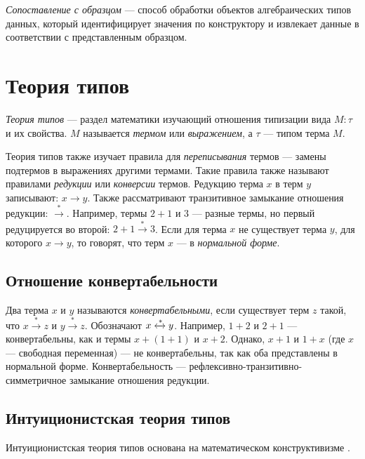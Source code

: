 \emph{Сопоставление с образцом} — способ обработки
объектов %
алгебраических типов данных, который идентифицирует значения по конструктору
и извлекает данные в соответствии с представленным образцом.

\section{Теория типов}

\emph{Теория типов} — раздел математики изучающий отношения типизации вида
$ M : \tau $ и их свойства. $M$ называется \emph{термом} или \emph{выражением},
а $\tau$ — типом терма $M$.

Теория типов также изучает правила для \emph{переписывания} термов — замены
подтермов в выражениях другими термами.
Такие правила также называют правилами \emph{редукции} или \emph{конверсии} термов.
Редукцию терма $x$ в терм $y$ записывают: $x \to y$.
Также рассматривают транзитивное замыкание отношения редукции: $ \xrightarrow{*} $.
Например, термы $2 + 1$ и $3$ — разные термы, но первый редуцируется во второй:
$2 + 1 \xrightarrow{*} 3$.
Если для терма $x$ не существует терма $y$, для которого $x \to y$,
то говорят, что терм $x$ — в \emph{нормальной форме}.

\subsection{Отношение конвертабельности}

Два терма $x$ и $y$ называются \emph{конвертабельными},
если существует терм $z$ такой, что $x \xrightarrow{*} z$ и $y \xrightarrow{*} z$. Обозначают  $x \xleftrightarrow{*} y$.
Например, $1+2$ и $2+1$ — конвертабельны, как и термы
$x + (1 + 1)$ и $x + 2$. Однако, $x+1$ и $1+x$ (где $x$ — свободная переменная)
— не конвертабельны, так как оба представлены в нормальной форме.
Конвертабельность — рефлексивно-транзитивно-симметричное замыкание отношения
редукции.

\subsection{Интуиционистская теория типов}

Интуиционистская теория типов основана на математическом конструктивизме \cite{MLTT}.

